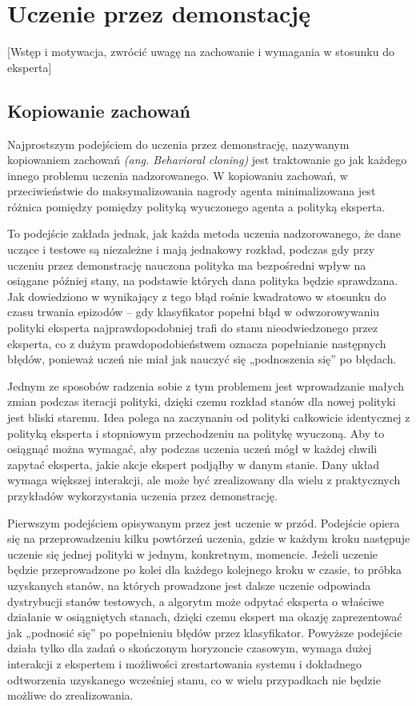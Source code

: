 \section{Uczenie przez demonstację}\label{imitation_learning}
[Wstęp i motywacja, zwrócić uwagę na zachowanie i wymagania w stosunku do eksperta]

\subsection{Kopiowanie zachowań}

Najprostszym podejściem do uczenia przez demonstrację, nazywanym kopiowaniem zachowań \textit{(ang. Behavioral cloning)} jest traktowanie go jak każdego innego problemu uczenia nadzorowanego. W kopiowaniu zachowań, w przeciwieństwie do maksymalizowania nagrody agenta minimalizowana jest różnica pomiędzy pomiędzy polityką wyuczonego agenta a polityką eksperta.

To podejście zakłada jednak, jak każda metoda uczenia nadzorowanego, że dane uczące i testowe są niezależne i mają jednakowy rozkład, podczas gdy przy uczeniu przez demonstrację nauczona polityka ma bezpośredni wpływ na osiągane później stany, na podstawie których dana polityka będzie sprawdzana. Jak dowiedziono w \cite{DBLP:journals/corr/abs-1011-0686} wynikający z tego błąd rośnie kwadratowo w stosunku do czasu trwania epizodów – gdy klasyfikator popełni błąd w odwzorowywaniu polityki eksperta najprawdopodobniej trafi do stanu nieodwiedzonego przez eksperta, co z dużym prawdopodobieństwem oznacza popełnianie następnych błędów, ponieważ uczeń nie miał jak nauczyć się „podnoszenia się” po błędach.

Jednym ze sposobów radzenia sobie z tym problemem jest wprowadzanie małych zmian podczas iteracji polityki, dzięki czemu rozkład stanów dla nowej polityki jest bliski staremu. Idea polega na zaczynaniu od polityki całkowicie identycznej z polityką eksperta i stopniowym przechodzeniu na politykę wyuczoną. Aby to osiągnąć można wymagać, aby podczas uczenia uczeń mógł w każdej chwili zapytać eksperta, jakie akcje ekspert podjąłby w danym stanie. Dany układ wymaga większej interakcji, ale może być zrealizowany dla wielu z praktycznych przykładów wykorzystania uczenia przez demonstrację.

Pierwszym podejściem opisywanym przez \cite{DBLP:journals/corr/abs-1011-0686} jest uczenie w przód. Podejście opiera się na przeprowadzeniu kilku powtórzeń uczenia, gdzie w każdym kroku następuje uczenie się jednej polityki w jednym, konkretnym, momencie. Jeżeli uczenie będzie przeprowadzone po kolei dla każdego kolejnego kroku w czasie, to próbka uzyskanych stanów, na których prowadzone jest dalsze uczenie odpowiada dystrybucji stanów testowych, a algorytm może odpytać eksperta o właściwe działanie w osiągniętych stanach, dzięki czemu ekspert ma okazję zaprezentować jak „podnosić się” po popełnieniu błędów przez klasyfikator. Powyższe podejście działa tylko dla zadań o skończonym horyzoncie czasowym, wymaga dużej interakcji z ekspertem i możliwości zrestartowania systemu i dokładnego odtworzenia uzyskanego wcześniej stanu, co w wielu przypadkach nie będzie możliwe do zrealizowania.

